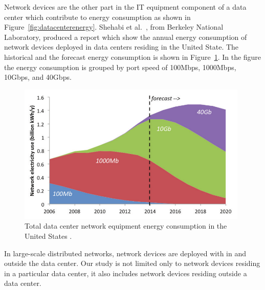 Network devices are the other part in the IT equipment component of a data center which contribute to energy consumption as shown in Figure~\ref{fig:datacenterenergy}. Shehabi et al.{\ }\cite{shehabi2016united}, from Berkeley National Laboratory, produced a report which show the annual energy consumption of network devices deployed in data centers residing in the United State. The historical and the forecast energy consumption is shown in Figure~\ref{fig:usnetworkenergy}. In the figure the energy consumption is grouped by port speed of 100Mbps, 1000Mbps, 10Gbps, and 40Gbps. 
\begin{figure}[ht]
	\begin{center}
		\includegraphics[width=11cm]{images/usnetworkenergy.pdf}
		\caption{Total data center network equipment energy consumption in the United States \cite{shehabi2016united}.}
		\label{fig:usnetworkenergy}
	\end{center}
\end{figure}

In large-scale distributed networks, network devices are deployed with in and outside the data center. Our study is not limited only to network devices residing in a particular data center, it also includes network devices residing outside a data center. 

